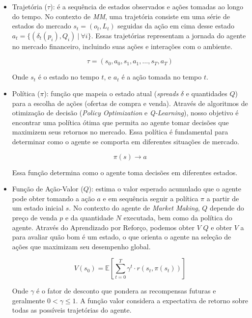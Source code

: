 \begin{itemize}
	\item Trajetória ($\tau$): é a sequência de estados observados e ações tomadas ao longo do tempo. No contexto de \textit{MM}, uma trajetória consiste em uma série de estados do mercado $s_{t} = (o_{t}, L_{t})$ seguidas da ação em cima desse estado $a_{t} = \{(\delta_{t}(p_{i}), Q_{i}) \ | \ \forall i \}$. Essas trajetórias representam a jornada do agente no mercado financeiro, incluindo suas ações e interações com o ambiente.
	
	\[
	\tau = (s_0, a_0, s_1, a_1, \ldots, s_T, a_T)
	\]
	
	Onde \(s_t\) é o estado no tempo \(t\), e \(a_t\) é a ação tomada no tempo \(t\).
	
	\item Política ($\pi$): função que mapeia o estado atual (\textit{spreads} $\delta$ e quantidades $Q$) para a escolha de ações (ofertas de compra e venda). Através de algoritmos de otimização de decisão (\textit{Policy Optimization} e \textit{Q-Learning}), nosso objetivo é encontrar uma política ótima que permita ao agente tomar decisões que maximizem seus retornos no mercado. Essa política é fundamental para determinar como o agente se comporta em diferentes situações de mercado.
	
	\[
	\pi(s) \rightarrow a
	\]
	
	Essa função determina como o agente toma decisões em diferentes estados.
	
	\item Função de Ação-Valor ($Q$): estima o valor esperado acumulado que o agente pode obter tomando a ação $a$ e em sequência seguir a política \(\pi\) a partir de um estado inicial $s$. No contexto do agente de \textit{Market Making}, $Q$ depende do preço de venda $p$ e da quantidade $N$ executada, bem como da política do agente. Através do Aprendizado por Reforço, podemos obter $V$ \(Q\) e obter $V$ a  para avaliar quão bom é um estado, o que orienta o agente na seleção de ações que maximizam seu desempenho global.
	
	\begin{equation*}
		V(s_0) = \mathbb{E}\left[\sum_{t=0}^{T} \gamma^t \cdot r(s_t, \pi(s_t)) \right]
		\end{equation*}
	
	Onde $\gamma$ é o fator de desconto que pondera as recompensas futuras e geralmente $0 < \gamma \leq 1$. A função valor considera a expectativa de retorno sobre todas as possíveis trajetórias do agente.
\end{itemize}

